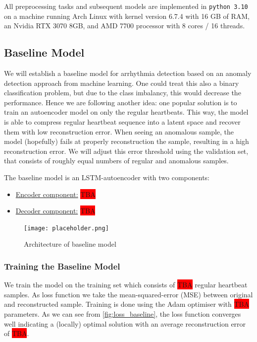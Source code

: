 All preprocessing tasks and subsequent models are implemented in \texttt{python 3.10} on a machine running Arch Linux with kernel version 6.7.4 with 16 GB of RAM, an Nvidia RTX 3070 8GB, and AMD 7700 processor with 8 cores / 16 threads.

\subsection{Baseline Model}
We will establish a baseline model for arrhythmia detection based on an anomaly detection approach from machine learning. One could treat this also a binary classification problem, but due to the class imbalancy, this would decrease the performance. Hence we are following another idea: one popular solution is to train an autoencoder model on only the regular heartbeats. This way, the model is able to compress regular heartbeat sequence into a latent space and recover them with low reconstruction error. When seeing an anomalous sample, the model (hopefully) fails at properly reconstruction the sample, resulting in a high reconstruction error. We will adjust this error threshold using the validation set, that consists of roughly equal numbers of regular and anomalous samples.

The baseline model is an LSTM-autoencoder with two components:
\begin{itemize}
    \item \underline{Encoder component:} \colorbox{red}{TBA}
    \item \underline{Decoder component:} \colorbox{red}{TBA}
\end{itemize}

\begin{figure}[h]
    \centering
    \texttt{[image: placeholder.png]}
    \caption{Architecture of baseline model}
    \label{fig:arch_baseline}
\end{figure}

\subsubsection*{Training the Baseline Model}
We train the model on the training set which consists of \colorbox{red}{TBA} regular heartbeat samples. As loss function we take the mean-squared-error (MSE) between original and reconstructed sample. Training is done using the Adam optimiser with \colorbox{red}{TBA} parameters. As we can see from \cref{fig:loss_baseline}, the loss function converges well indicating a (locally) optimal solution with an average reconstruction error of \colorbox{red}{TBA}. 

